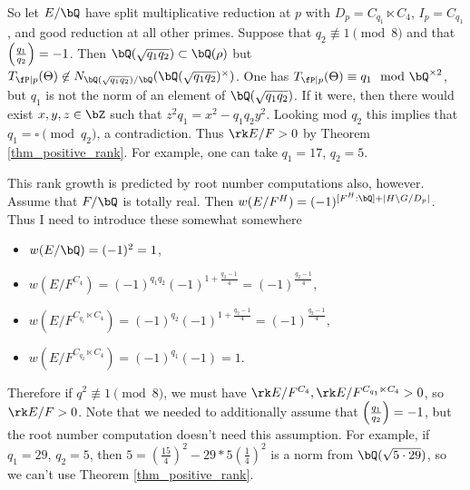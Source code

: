 \begin{example}
    So let $E / \bQ$ have split multiplicative reduction at $p$ with $D_p = C_{q_1} \ltimes C_4$, $I_p = C_{q_1}$, and good reduction at all other primes. Suppose that $q_2 \not\equiv 1 \pmod 8$ and that $\left( \frac{q_1}{q_2} \right)  = -1$. Then $\bQ(\sqrt{q_1 q_2}) \subset \bQ(\rho)$ but $T_{\fP \mid p}(\Theta) \not\in N_{\bQ(\sqrt{q_1 q_2}) / \bQ}(\bQ(\sqrt{q_1 q_2})^{\times})$. One has $T_{\fP \mid p}(\Theta) \equiv q_1 \mod \bQ^{\times 2}$, but $q_1$ is not the norm of an element of $\bQ(\sqrt{q_1 q_2})$. 
    If it were, then there would exist $x, y, z \in \bZ$ such that $z^2 q_1 = x^2 - q_1 q_2 y^2$. Looking mod $q_2$ this implies that $q_1 = \square \pmod {q_2}$, a contradiction. Thus $\rk E / F > 0$ by Theorem \ref{thm_positive_rank}. For example, one can take $q_1 = 17$, $q_2 = 5$. 

    This rank growth is predicted by root number computations also, however. Assume that $F / \bQ$ is totally real. Then $w(E / F^H) = (-1)^{[F^H : \bQ] + | H \backslash G / D_p|}$. Thus {\color{red} I need to introduce these somewhat somewhere}
    \begin{itemize}[--]
        \setlength\itemsep{0em}
        \item $w(E / \bQ) = (-1)^2 = 1$,
        \item $w(E / F^{C_4}) = (-1)^{q_1 q_2} (-1)^{1 + \frac{q_2 - 1}{4}} = (-1)^{\frac{q_2 - 1}{4}}$,
        \item $w(E / F^{C_{q_1} \ltimes C_4}) = (-1)^{q_2}(-1)^{1 + \frac{q_2 - 1}{4}} = (-1)^{\frac{q_2 - 1}{4}},$
        \item $w(E / F^{C_{q_2} \ltimes C_4}) = (-1)^{q_1}(-1) = 1$. 
    \end{itemize}
    Therefore if $q^2 \not\equiv 1 \pmod 8$, we must have $\rk E / F^{C_4}, \rk E / F^{C_{q_1} \ltimes C_4} > 0$, so $\rk E / F > 0$. Note that we needed to additionally assume that $\left( \frac{q_1}{q_2} \right)  = -1$, but the root number computation doesn't need this assumption. For example, if $q_1 = 29$, $q_2 = 5$, then $5 = (\frac{15}{4})^2 - 29*5(\frac{1}{4})^2$ is a norm from $\bQ(\sqrt{5 \cdot 29})$, so we can't use Theorem \ref{thm_positive_rank}. 
\end{example}

\begin{example}

\end{example}